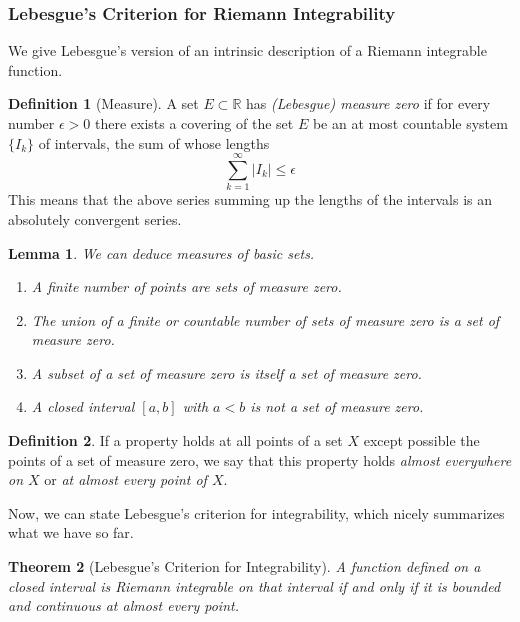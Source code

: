 \documentclass{article}
\newtheorem{theorem}{Theorem}[section]
\newtheorem{lemma}[theorem]{Lemma}
\theoremstyle{remark}
\theoremstyle{definition}
\newtheorem{definition}{Definition}[section]
\begin{document}
\subsubsection{Lebesgue's Criterion for Riemann Integrability}
We give Lebesgue's version of an intrinsic description of a Riemann integrable function. 

\begin{definition}[Measure]
A set $E \subset \mathbb{R}$ has \textit{(Lebesgue) measure zero} if for every number $\epsilon > 0$ there exists a covering of the set $E$ be an at most countable system $\{I_k\}$ of intervals, the sum of whose lengths 
\[\sum_{k=1}^\infty |I_k| \leq \epsilon\]
This means that the above series summing up the lengths of the intervals is an absolutely convergent series. 
\end{definition}

\begin{lemma}
We can deduce measures of basic sets. 
\begin{enumerate}
    \item A finite number of points are sets of measure zero. 
    \item The union of a finite or countable number of sets of measure zero is a set of measure zero. \item A subset of a set of measure zero is itself a set of measure zero. 
    \item A closed interval $[a, b]$ with $a<b$ is not a set of measure zero. 
\end{enumerate}
\end{lemma}

\begin{definition}
If a property holds at all points of a set $X$ except possible the points of a set of measure zero, we say that this property holds \textit{almost everywhere on $X$} or \textit{at almost every point of $X$}. 
\end{definition}

Now, we can state Lebesgue's criterion for integrability, which nicely summarizes what we have so far. 

\begin{theorem}[Lebesgue's Criterion for Integrability]
A function defined on a closed interval is Riemann integrable on that interval if and only if it is bounded and continuous at almost every point. 
\end{theorem}
\end{document}
